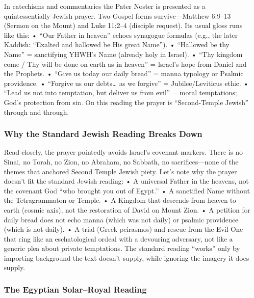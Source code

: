 In catechisms and commentaries the Pater Noster is presented as a quintessentially Jewish prayer.
Two Gospel forms survive---Matthew 6:9--13 (Sermon on the Mount) and Luke 11:2--4 (disciple request).
Its usual gloss runs like this: • ``Our Father in heaven'' echoes synagogue formulas (e.g., the later Kaddish: ``Exalted and hallowed be His great Name'').
• ``Hallowed be thy Name'' = sanctifying YHWH's Name (already holy in Israel).
• ``Thy kingdom come / Thy will be done on earth as in heaven'' = Israel's hope from Daniel and the Prophets.
• ``Give us today our daily bread'' = manna typology or Psalmic providence.
• ``Forgive us our debts\ldots{} as we forgive'' = Jubilee/Leviticus ethic.
• ``Lead us not into temptation, but deliver us from evil'' = moral temptations; God's protection from sin.
On this reading the prayer is ``Second-Temple Jewish'' through and through.

\subsubsection{Why the Standard Jewish Reading Breaks Down}

Read closely, the prayer pointedly avoids Israel's covenant markers.
There is no Sinai, no Torah, no Zion, no Abraham, no Sabbath, no sacrifices---none of the themes that anchored Second Temple Jewish piety.
Let's note why the prayer doesn't fit the standard Jewish reading:
• A universal Father in the heavens, not the covenant God ``who brought you out of Egypt.’’
• A sanctified Name without the Tetragrammaton or Temple.
• A Kingdom that descends from heaven to earth (cosmic axis), not the restoration of David on Mount Zion.
• A petition for daily bread does not echo manna (which was not daily) or psalmic providence (which is not daily).
• A trial (Greek peirasmos) and rescue from the Evil One that ring like an eschatological ordeal with a devouring adversary, not like a generic plea about private temptations.
The standard reading ``works'' only by importing background the text doesn't supply, while ignoring the imagery it does supply.

\subsubsection{The Egyptian Solar--Royal Reading}

